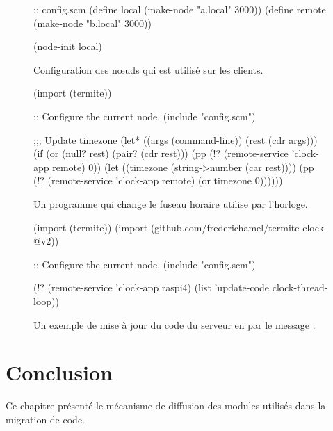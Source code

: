 \begin{figure}[h!]
\begin{center}
\begin{mplisting}{1}
;; config.scm
(define local (make-node "a.local" 3000))
(define remote (make-node "b.local" 3000))

(node-init local)
\end{mplisting}
\end{center}
  \caption{Configuration des nœuds qui est utilisé sur les clients.}
  \vspace*{4ex}
\end{figure}

\begin{figure}[h!]
\begin{center}
\begin{mplisting}{1}
(import (termite))

;; Configure the current node.
(include "config.scm")

;;; Update timezone
(let* ((args (command-line))
       (rest (cdr args)))
  (if (or (null? rest)
          (pair? (cdr rest)))
      (pp (!? (remote-service 'clock-app remote) 0))
      (let ((timezone (string->number (car rest))))
        (pp (!? (remote-service 'clock-app remote) (or timezone 0))))))
\end{mplisting}
\end{center}
  \caption{Un programme qui change le fuseau horaire utilise par
    l'horloge.}
  \vspace*{4ex}
\end{figure}

\begin{figure}[h!]
\begin{center}
\begin{mplisting}{1}
(import (termite))
(import (github.com/frederichamel/termite-clock @v2))

;; Configure the current node.
(include "config.scm")

(!? (remote-service 'clock-app raspi4)
    (list 'update-code clock-thread-loop))
\end{mplisting}
\end{center}
  \caption{Un exemple de mise à jour du code du serveur en
    par le message .}
  \vspace*{4ex}
\end{figure}

\section{Conclusion}
Ce chapitre présenté le mécanisme de diffusion des modules utilisés
dans la migration de code.
